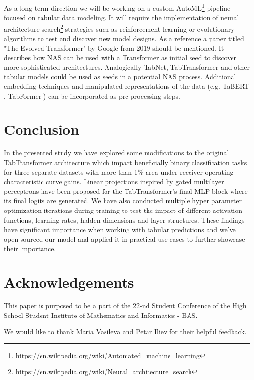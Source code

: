 \documentclass{article}
\begin{document}
As a long term direction we will be working on a custom AutoML\footnote{\url{https://en.wikipedia.org/wiki/Automated_machine_learning}} pipeline focused on tabular data modeling. It will require the implementation of neural architecture search\footnote{\url{https://en.wikipedia.org/wiki/Neural_architecture_search}} strategies such as reinforcement learning or evolutionary algorithms \cite{elsken2019neural} to test and discover new model designs. As a reference a paper titled "The Evolved Transformer" \cite{so2019evolved} by Google from 2019 should be mentioned. It describes how NAS can be used with a Transformer \cite{vaswani2017attention} as initial seed to discover more sophisticated architectures. Analogically TabNet, TabTransformer and other tabular models could be used as seeds in a potential NAS process. Additional embedding techniques and manipulated representations of the data (e.g. TaBERT \cite{yin2020tabert}, TabFormer \cite{padhi2021tabular}) can be incorporated as pre-processing steps.

\section{Conclusion}

In the presented study we have explored some modifications to the original TabTransformer \cite{Huang2020TabTransformerTD} architecture which impact beneficially binary classification tasks for three separate datasets with more than 1\% area under receiver operating characteristic curve gains. Linear projections inspired by gated multilayer perceptrons \cite{Liu2021PayAT} have been proposed for the TabTransformer's final MLP block where its final logits are generated. We have also conducted multiple hyper parameter optimization iterations during training to test the impact of different activation functions, learning rates, hidden dimensions and layer structures. These findings have significant importance when working with tabular predictions and we've open-sourced our model and applied it in practical use cases to further showcase their importance.

\section{Acknowledgements}

This paper is purposed to be a part of the 22-nd Student Conference of the High School Student Institute of Mathematics and Informatics - BAS.

We would like to thank Maria Vasileva and Petar Iliev for their helpful feedback.
\end{document}
